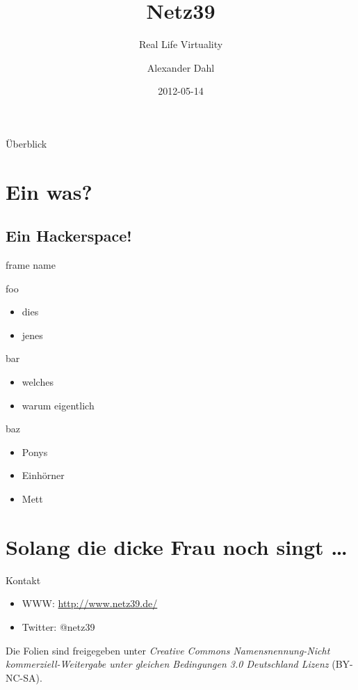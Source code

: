 \documentclass[hyperref={pdfpagelabels=false}]{beamer}
\title[Netz39]{Netz39}
\subtitle{Real Life Virtuality}
\author{Alexander Dahl}
\institute[netz39.de]{\url{http://www.netz39.de/}}
\date{2012-05-14}
\begin{document}
 

\begin{frame}
	\titlepage
\end{frame}

\begin{frame}{Überblick}
    \tableofcontents
\end{frame}

\section{Ein was?}

\subsection{Ein Hackerspace!}

\begin{frame}{frame name}
    \begin{block}{foo}
        \begin{itemize}
            \item dies
            \item jenes
        \end{itemize}
    \end{block}
    \pause
    \begin{block}{bar}
        \begin{itemize}
            \item welches
            \item warum eigentlich
        \end{itemize}
    \end{block}
    \pause
    \begin{block}{baz}
        \begin{itemize}
            \item Ponys
            \item Einhörner
            \item Mett
        \end{itemize}
    \end{block}
\end{frame}

\section*{Solang die dicke Frau noch singt \dots}

\begin{frame}{Kontakt}
    \begin{itemize}
        \item WWW: \url{http://www.netz39.de/}
        \item Twitter: @netz39
    \end{itemize}

    \vspace{1em}
    \small
    Die Folien sind freigegeben unter \emph{Creative Commons
    Namensnennung-Nicht kommerziell-Weitergabe unter gleichen
    Bedingungen 3.0 Deutschland Lizenz} (BY-NC-SA).
    \normalsize
\end{frame}
\end{document}

